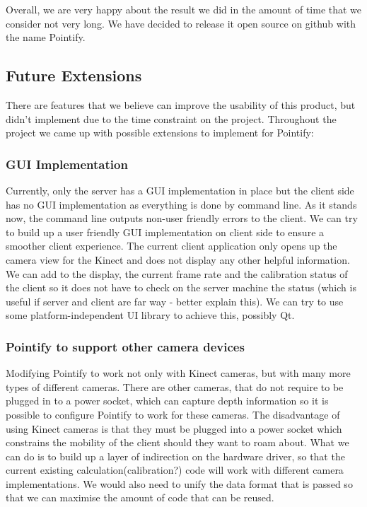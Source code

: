 \documentclass{article}
\begin{document}

Overall, we are very happy about the result we did in the amount of time that we consider not very long. We have decided to release it open source on github with the name Pointify.
\newpage
\subsection{Future Extensions}
There are features that we believe can improve the usability of this product, but didn't implement due to the time constraint on the project. Throughout the project we came up with possible extensions to implement for Pointify:
\subsubsection{GUI Implementation}
Currently, only the server has a GUI implementation in place but the client side has no GUI implementation as everything is done by command line. As it stands now, the command line outputs non-user friendly errors to the client. We can try to build up a user friendly GUI implementation on client side to ensure a smoother client experience. The current client application only opens up the camera view for the Kinect and does not display any other helpful information. We can add to the display, the current frame rate and the calibration status of the client so it does not have to check on the server machine the status (which is useful if server and client are far way - better explain this). We can try to use some platform-independent UI library to achieve this, possibly Qt.
\subsubsection{Pointify to support other camera devices}
Modifying Pointify to work not only with Kinect cameras, but with many more types of different cameras. There are other cameras, that do not require to be plugged in to a power socket, which can capture depth information so it is possible to configure Pointify to work for these cameras. The disadvantage of using Kinect cameras is that they must be plugged into a power socket which constrains the mobility of the client should they want to roam about. What we can do is to build up a layer of indirection on the hardware driver, so that the current existing calculation(calibration?) code will work with different camera implementations. We would also need to unify the data format that is passed so that we can maximise the amount of code that can be reused.
\end{document}
